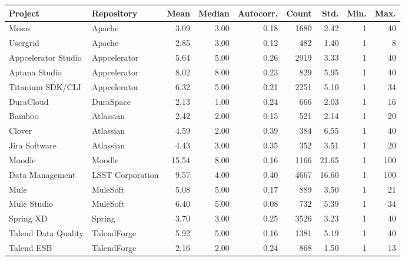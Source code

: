 \begin{tabular}{llrrrrrrr}
\toprule
             Project &        Repository &  Mean &  Median &  Autocorr. &  Count &  Std. &  Min. &  Max. \\
\midrule
               Mesos &            Apache &  3.09 &    3.00 &       0.18 &   1680 &  2.42 &     1 &    40 \\
            Usergrid &            Apache &  2.85 &    3.00 &       0.12 &    482 &  1.40 &     1 &     8 \\
 Appcelerator Studio &      Appcelerator &  5.64 &    5.00 &       0.26 &   2919 &  3.33 &     1 &    40 \\
       Aptana Studio &      Appcelerator &  8.02 &    8.00 &       0.23 &    829 &  5.95 &     1 &    40 \\
    Titanium SDK/CLI &      Appcelerator &  6.32 &    5.00 &       0.21 &   2251 &  5.10 &     1 &    34 \\
           DuraCloud &         DuraSpace &  2.13 &    1.00 &       0.24 &    666 &  2.03 &     1 &    16 \\
              Bamboo &         Atlassian &  2.42 &    2.00 &       0.15 &    521 &  2.14 &     1 &    20 \\
              Clover &         Atlassian &  4.59 &    2.00 &       0.39 &    384 &  6.55 &     1 &    40 \\
       Jira Software &         Atlassian &  4.43 &    3.00 &       0.35 &    352 &  3.51 &     1 &    20 \\
              Moodle &            Moodle & 15.54 &    8.00 &       0.16 &   1166 & 21.65 &     1 &   100 \\
     Data Management &  LSST Corporation &  9.57 &    4.00 &       0.40 &   4667 & 16.60 &     1 &   100 \\
                Mule &          MuleSoft &  5.08 &    5.00 &       0.17 &    889 &  3.50 &     1 &    21 \\
         Mule Studio &          MuleSoft &  6.40 &    5.00 &       0.08 &    732 &  5.39 &     1 &    34 \\
           Spring XD &            Spring &  3.70 &    3.00 &       0.25 &   3526 &  3.23 &     1 &    40 \\
 Talend Data Quality &       TalendForge &  5.92 &    5.00 &       0.16 &   1381 &  5.19 &     1 &    40 \\
          Talend ESB &       TalendForge &  2.16 &    2.00 &       0.24 &    868 &  1.50 &     1 &    13 \\
\bottomrule
\end{tabular}
